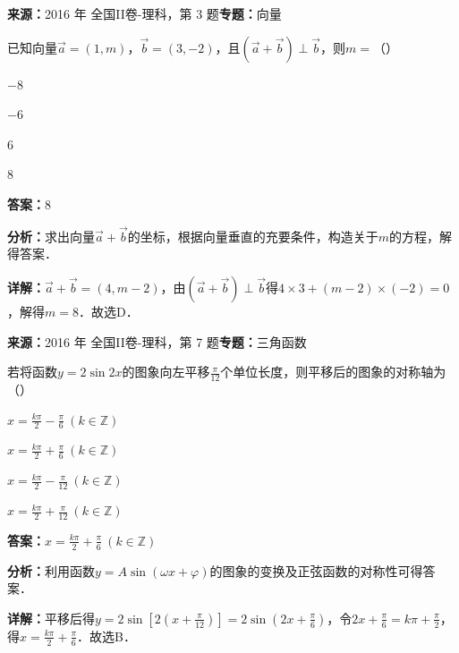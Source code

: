 \begin{question}[points=5]
\textbf{来源：}2016 年 全国II卷-理科，第 3 题\quad \textbf{专题：}向量\par
已知向量$\overrightarrow{a}=(1,m)$，$\overrightarrow{b}=(3,-2)$，且$(\overrightarrow{a}+\overrightarrow{b})\perp\overrightarrow{b}$，则$m=$（\quad）
\begin{choices}
  \item $-8$
  \item $-6$
  \item $6$
  \item $8$
\end{choices}
\begin{solution}
\textbf{答案：}$8$

\textbf{分析：}求出向量$\overrightarrow{a}+\overrightarrow{b}$的坐标，根据向量垂直的充要条件，构造关于$m$的方程，解得答案．

\textbf{详解：}$\overrightarrow{a}+\overrightarrow{b}=(4,m-2)$，由$(\overrightarrow{a}+\overrightarrow{b})\perp\overrightarrow{b}$得$4\times3+(m-2)\times(-2)=0$，解得$m=8$．故选D．
\end{solution}
\end{question}

\begin{question}[points=5]
\textbf{来源：}2016 年 全国II卷-理科，第 7 题\quad \textbf{专题：}三角函数\par
若将函数$y=2\sin2x$的图象向左平移$\frac{\pi}{12}$个单位长度，则平移后的图象的对称轴为（\quad）
\begin{choices}
  \item $x=\frac{k\pi}{2}-\frac{\pi}{6}\ (k\in\mathbb{Z})$
  \item $x=\frac{k\pi}{2}+\frac{\pi}{6}\ (k\in\mathbb{Z})$
  \item $x=\frac{k\pi}{2}-\frac{\pi}{12}\ (k\in\mathbb{Z})$
  \item $x=\frac{k\pi}{2}+\frac{\pi}{12}\ (k\in\mathbb{Z})$
\end{choices}
\begin{solution}
\textbf{答案：}$x=\frac{k\pi}{2}+\frac{\pi}{6}\ (k\in\mathbb{Z})$

\textbf{分析：}利用函数$y=A\sin(\omega x+\varphi)$的图象的变换及正弦函数的对称性可得答案．

\textbf{详解：}平移后得$y=2\sin\left[2\left(x+\frac{\pi}{12}\right)\right]=2\sin\left(2x+\frac{\pi}{6}\right)$，令$2x+\frac{\pi}{6}=k\pi+\frac{\pi}{2}$，得$x=\frac{k\pi}{2}+\frac{\pi}{6}$．故选B．
\end{solution}
\end{question}


